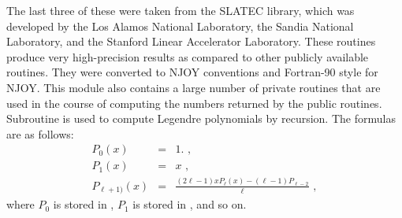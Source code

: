 \noindent
The last three of these were taken from the SLATEC library, which
was developed by the Los Alamos National Laboratory, the Sandia
National Laboratory, and the Stanford Linear Accelerator Laboratory.
These routines produce very high-precision results as compared to
other publicly available routines.  They were converted to NJOY
conventions and Fortran-90 style for NJOY.  This module also
contains a large number of private routines that are used in the
course of computing the numbers returned by the public routines.
Subroutine  is used to compute Legendre
polynomials by recursion.  The formulas are as follows:
\begin{eqnarray}
   P_0(x) & = &  1.\,\,, \\
   P_1(x) & = &  x \,\,,\\
   P_{\ell+1)}(x) & = & \frac{(2\ell-1)xP_\ell(x)-(\ell-1)P_{\ell-2}}
       {\ell} \,\,,
\end{eqnarray}
where $P_0$ is stored in , $P_1$ is stored in
, and so on.

\cleardoublepage

